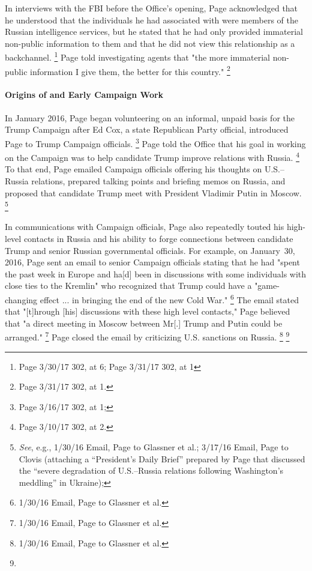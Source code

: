In interviews with the FBI before the Office's opening, Page acknowledged that he understood that the individuals he had associated with were members of the Russian intelligence services, but he stated that he had only provided immaterial non-public information to them and that he did not view this relationship as a backchannel.%
\footnote{Page 3/30/17 302, at 6; Page 3/31/17 302, at 1}
Page told investigating agents that "the more immaterial non-public information I give them, the better for this country."%
\footnote{Page 3/31/17 302, at 1.}

\paragraph{Origins of and Early Campaign Work}

In January 2016, Page began volunteering on an informal, unpaid basis for the Trump Campaign after Ed Cox, a state Republican Party official, introduced Page to Trump Campaign officials.%
\footnote{Page 3/16/17 302, at 1; }
Page told the Office that his goal in working on the Campaign was to help candidate Trump improve relations with Russia.%
\footnote{Page 3/10/17 302, at 2.}
To that end, Page emailed Campaign officials offering his thoughts on U.S.--Russia relations, prepared talking points and briefing memos on Russia, and proposed that candidate Trump meet with President Vladimir Putin in Moscow.%
\footnote{\textit{See}, e.g., 1/30/16 Email, Page to Glassner et al.;
3/17/16 Email, Page to Clovis (attaching a “President's Daily Brief” prepared by Page that discussed the “severe degradation of U.S.--Russia relations following Washington's meddling” in Ukraine); }

In communications with Campaign officials, Page also repeatedly touted his high-level contacts in Russia and his ability to forge connections between candidate Trump and senior Russian governmental officials.
For example, on January~30, 2016, Page sent an email to senior Campaign officials stating that he had "spent the past week in Europe and ha[d] been in discussions with some individuals with close ties to the Kremlin" who recognized that Trump could have a "game-changing effect ... in bringing the end of the new Cold War."%
\footnote{1/30/16 Email, Page to Glassner et al.}
The email stated that "[t]hrough [his] discussions with these high level contacts," Page believed that "a direct meeting in Moscow between Mr[.] Trump and Putin could be arranged."%
\footnote{1/30/16 Email, Page to Glassner et al.}
Page closed the email by criticizing U.S. sanctions on Russia.%
\footnote{1/30/16 Email, Page to Glassner et al.}
\footnote{}

